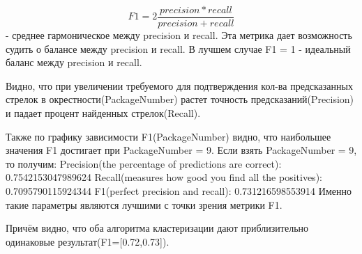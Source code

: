 \begin{equation}
F1 = 2 \dfrac{precision * recall}{precision + recall}
\end{equation} - среднее гармоническое между precision и recall. Эта метрика дает возможность судить о балансе между precision и recall. В лучшем случае F1 = 1 - идеальный баланс между precision и recall.

Видно, что при увеличении требуемого для подтверждения кол-ва предсказанных стрелок в окрестности(PackageNumber) растет точность предсказаний(Precision) и падает процент найденных стрелок(Recall).

Также по графику зависимости F1(PackageNumber) видно, что наибольшее значения F1 достигает при PackageNumber = 9. 
Если взять PackageNumber = 9, то получим:\newline
Precision(the percentage of predictions are correct): 0.7542153047989624\newline
Recall(measures how good you find all the positives): 0.7095790115924344\newline
F1(perfect precision and recall): 0.731216598553914\newline
Именно такие параметры являются лучшими с точки зрения метрики F1.

Причём видно, что оба алгоритма кластеризации дают приблизительно одинаковые результат(F1=[0.72,0.73]). 

